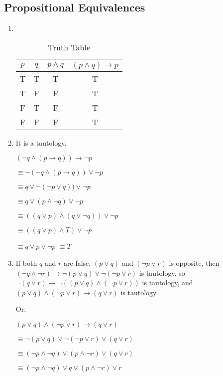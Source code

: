 \documentclass{../../cls/sig-alternate-05-2015}
\begin{document}
\subsection{Propositional Equivalences}
\begin{enumerate}
\item {\ }
\begin{table}[htb]
	\centering
	\caption{Truth Table}
	\begin{tabular}{cccc} \toprule
		$p$ & $q$ & $p \wedge q$ & $(p \wedge q) \rightarrow p$\\ \midrule
		T & T & T & T\\ 
		T & F & F & T\\
		F & T & F & T\\
		F & F & F & T\\
		\hline\end{tabular}
\end{table}


\item It is a tautology.

$(\neg q \wedge (p \rightarrow q)) \rightarrow \neg p$

$\equiv \neg (\neg q \wedge (p \rightarrow q)) \vee \neg p$

$\equiv q \vee \neg (\neg p \vee q)) \vee \neg p$

$\equiv q \vee ( p \wedge \neg q) \vee \neg p$

$\equiv ((q \vee p) \wedge (q \vee \neg q) ) \vee \neg p$

$\equiv ((q \vee p) \wedge T ) \vee \neg p$

$\equiv q \vee p \vee \neg p$
$\equiv T$

\item If both $q$ and $r$ are false, $(p \vee q)$ and $(\neg p \vee r)$ is opposite, then $(\neg q \wedge \neg r) \rightarrow \neg (p \vee q) \vee \neg (\neg p \vee r)$ is tautology, so $\neg(q \vee r) \rightarrow \neg ((p \vee q) \wedge (\neg p \vee r))$ is tautology, and $(p \vee q) \wedge (\neg p \vee r) \rightarrow (q \vee r)$ is tautology.

Or:

$(p\vee q) \wedge (\neg p \vee r)\rightarrow (q \vee r)$

$\equiv \neg (p\vee q) \vee \neg (\neg p \vee r)\vee  (q \vee r)$

$\equiv (\neg p\wedge \neg q) \vee (p \wedge \neg r)\vee  (q \vee r)$

$\equiv (\neg p\wedge \neg q) \vee q \vee (p \wedge \neg r) \vee r$


\end{enumerate}
\end{document}
